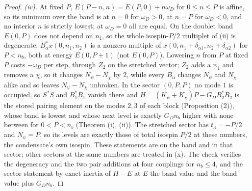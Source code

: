 \begin{proof}
\emph{(iv).} At fixed $P$, $E(P - n, n) = E(P, 0) + n\omega_{D}$ for $0 \le n \le P$ is affine, so its minimum over the band is at $n = 0$ for $\omega_{D} > 0$, at $n = P$ for $\omega_{D} < 0$, and no interior $n$ is strictly lowest; at $\omega_{D} = 0$ all are equal. On the doublet band $E(0, P)$ does not depend on $n_{1}$, so the whole isospin-$P/2$ multiplet of (ii) is degenerate; $B_{\alpha}^{*}x(0, n_{1}, n_{2})$ is a nonzero multiple of $x(0, n_{1} + \delta_{\alpha1}, n_{2} + \delta_{\alpha2})$ for $P < n_{b}$, both at energy $E(0, P + 1)$ (not $E(0, P)$). Lowering $n$ from $P$ at fixed $P$ costs $-\omega_{D}$ per step, through $Z_{2}$ on the stretched vector; $Z_{2}$ adds a $\psi_{1}$ and removes a $\chi$, so it changes $N_{\psi} - N_{\chi}$ by $2$, while every $B_{\alpha}$ changes $N_{\psi}$ and $N_{\chi}$ alike and so leaves $N_{\psi} - N_{\chi}$ unbroken. In the sector $(0, P, P)$ no mode $1$ is occupied, so $S^{*}S$ and $B_{1}^{*}B_{1}$ vanish there and $H = (K_{\psi} + K_{\chi})P - G_{D}B_{2}^{*}B_{2}$ is the stored pairing element on the modes $2, 3$ of each block (Proposition (2)), whose band is lowest and whose next level is exactly $G_{D}n_{b}$ higher with none between for $0 < P < n_{b}$ (Theorem (i), (ii)). The stretched sector has $t_{3} = -P/2$ and $N_{\psi} = P$, so its levels are exactly those of total isospin $P/2$ at these numbers, the condensate's own isospin. These statements are on the band and in that sector; other sectors at the same numbers are treated in (x). The check verifies the degeneracy and the two pair additions at four couplings for $n_{b} \le 4$, and the sector statement by exact inertia of $H - E$ at $E$ the band value and the band value plus $G_{D}n_{b}$.


\end{proof}
